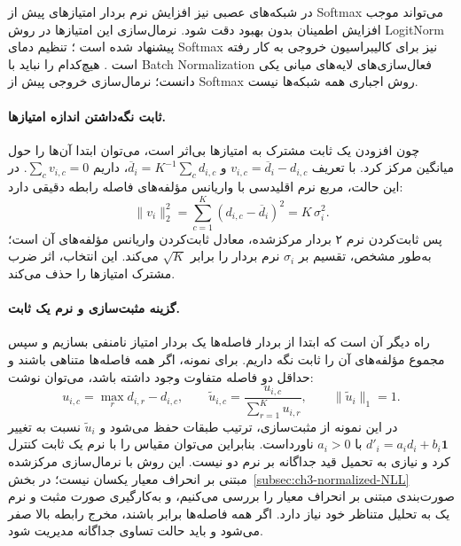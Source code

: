 در شبکه‌های عصبی نیز افزایش نرم بردار امتیازهای پیش از Softmax می‌تواند موجب افزایش اطمینان بدون بهبود دقت شود. نرمال‌سازی این امتیازها در روش LogitNorm پیشنهاد شده است \cite{Wei2022LogitNorm}؛ تنظیم دمای Softmax نیز برای کالیبراسیون خروجی به کار رفته است \cite{Guo2017Calibration}. هیچ‌کدام را نباید با Batch Normalization فعال‌سازی‌های لایه‌های میانی یکی دانست؛ نرمال‌سازی خروجی پیش از Softmax روش اجباری همه شبکه‌ها نیست.

\paragraph{ثابت نگه‌داشتن اندازه امتیازها.}
چون افزودن یک ثابت مشترک به امتیازها بی‌اثر است، می‌توان ابتدا آن‌ها را حول میانگین مرکز کرد. با تعریف
$v_{i,c}=\overline d_i-d_{i,c}$ و
$\overline d_i=K^{-1}\sum_c d_{i,c}$، داریم $\sum_cv_{i,c}=0$. در این حالت، مربع نرم اقلیدسی با واریانس مؤلفه‌های فاصله رابطه دقیقی دارد:
\begin{equation}\label{eq:ch3-NLL-centered-L2}
\|v_i\|_2^2=\sum_{c=1}^{K}(d_{i,c}-\overline d_i)^2
=K\,\sigma_i^2.
\end{equation}
پس ثابت‌کردن نرم ۲ بردار مرکز‌شده، معادل ثابت‌کردن واریانس مؤلفه‌های آن است؛ به‌طور مشخص، تقسیم بر $\sigma_i$ نرم بردار را برابر $\sqrt K$ می‌کند. این انتخاب، اثر ضرب مشترک امتیازها را حذف می‌کند.

\paragraph{گزینه مثبت‌سازی و نرم یک ثابت.}
راه دیگر آن است که ابتدا از بردار فاصله‌ها یک بردار امتیاز نامنفی بسازیم و سپس مجموع مؤلفه‌های آن را ثابت نگه داریم. برای نمونه، اگر همه فاصله‌ها متناهی باشند و حداقل دو فاصله متفاوت وجود داشته باشد، می‌توان نوشت:
\begin{equation}\label{eq:ch3-NLL-positive-L1-example}
u_{i,c}=\max_{r}d_{i,r}-d_{i,c},
\qquad
\widetilde u_{i,c}=\frac{u_{i,c}}{\sum_{r=1}^{K}u_{i,r}},
\qquad \|\widetilde u_i\|_1=1.
\end{equation}
در این نمونه از مثبت‌سازی، ترتیب طبقات حفظ می‌شود و $\widetilde u_i$ نسبت به تغییر $d'_i=a_i d_i+b_i\mathbf1$ با $a_i>0$ ناورداست. بنابراین می‌توان مقیاس را با نرم یک ثابت کنترل کرد و نیازی به تحمیل قید جداگانه بر نرم دو نیست. این روش با نرمال‌سازی مرکز‌شده مبتنی بر انحراف معیار یکسان نیست؛ در بخش~\ref{subsec:ch3-normalized-NLL} صورت‌بندی مبتنی بر انحراف معیار را بررسی می‌کنیم، و به‌کارگیری صورت مثبت و نرم یک به تحلیل متناظر خود نیاز دارد. اگر همه فاصله‌ها برابر باشند، مخرج رابطه بالا صفر می‌شود و باید حالت تساوی جداگانه مدیریت شود.

